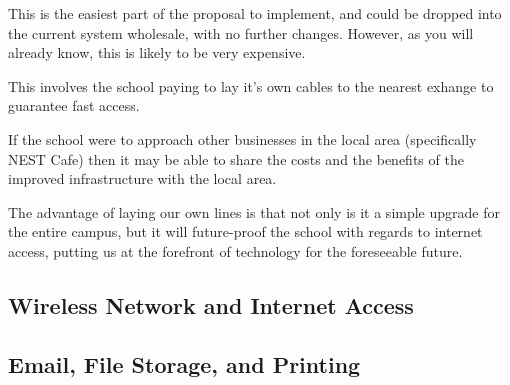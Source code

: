 \documentclass[a4paper,leqno,titlepage]{article}
\begin{document}
This is the easiest part of the proposal to implement, and could be dropped
into the current system wholesale, with no further changes. However, as you will
already know, this is likely to be very expensive.


This involves the school paying to lay it's own cables to the nearest exhange
to guarantee fast access.


If the school were to approach other businesses in the local area (specifically
NEST Cafe) then it may be able to share the costs and the benefits of the
improved infrastructure with the local area.


The advantage of laying our own lines is that not only is it a simple upgrade
for the entire campus, but it will future-proof the school with regards to
internet access, putting us at the forefront of technology for the foreseeable
future.




\subsection{Wireless Network and Internet Access}




\subsection{Email, File Storage, and Printing}


\end{document}
